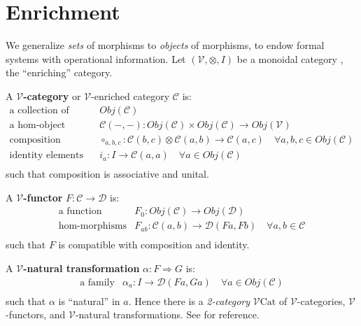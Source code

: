 \documentclass[a4paper,UKenglish]{article}
\theoremstyle{definition}
\newcommand{\Cat}{\mathrm{Cat}}
\newcommand{\V}{\mathscr{V}}
\newcommand{\D}{\mathscr{D}}
\newcommand{\C}{\mathscr{C}}
\begin{document}
\section{Enrichment}
We generalize \textit{sets} of morphisms to \textit{objects} of morphisms, to endow formal systems with operational information. Let $(\V,\otimes,I)$ be a monoidal category \cite{maclane}, the ``enriching'' category.

A \textbf{$\V$-category} or $\V$-enriched category $\C$ is:
\[\begin{array}{rl}
\text{a collection of objects} & Obj(\C)\\
\text{a hom-object function} & \C(-,-):Obj(\C) \times Obj(\C) \to Obj(\V)\\
\text{composition morphisms} & \circ_{a,b,c}:\C(b,c) \otimes \C(a,b) \to \C(a,c) \quad \forall a,b,c \in Obj(\C)\\
\text{identity elements} & i_a:I\to\C(a,a) \quad \forall a \in Obj(\C)\\
\end{array}\]
such that composition is associative and unital.

A \textbf{$\V$-functor} $F:\C \to \D$ is:
\[\begin{array}{rl}
\text{a function} & F_0: Obj(\C) \to Obj(\D)\\
\text{hom-morphisms} & F_{ab}: \C(a,b) \to \D(Fa,Fb) \quad \forall a,b \in \C\\
\end{array}\]
such that $F$ is compatible with composition and identity.

A \textbf{$\V$-natural transformation} $\alpha: F \Rightarrow G$ is:
\[\begin{array}{rl}
\text{a family} & \alpha_a: I \to \D(Fa,Ga) \quad \forall a \in Obj(\C)\\
\end{array}\]
such that $\alpha$ is ``natural'' in $a$. Hence there is a \textit{2-category} \textbf{$\V\Cat$} of $\V$-categories, $\V$-functors, and $\V$-natural transformations. See \cite{enrich} for reference.
\end{document}
